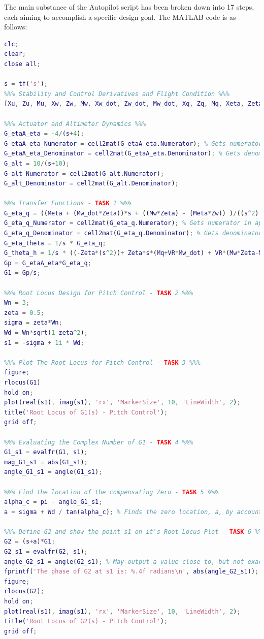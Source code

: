 \documentclass[stu, a4paper, 12pt, floatsintext]{apa7}
\numberwithin{figure}{section}
\numberwithin{table}{section}
\numberwithin{equation}{section}
\begin{document}
The main substance of the Autopilot script has been broken down into 17 steps, each aiming to accomplish a specific design goal. The MATLAB code is as follows:
\begin{lstlisting}[language=MATLAB]
%%% Workspace Cleanup %%%
clc;
clear;
close all;

s = tf('s');
%%% Stability and Control Derivatives and Flight Condition %%%
[Xu, Zu, Mu, Xw, Zw, Mw, Xw_dot, Zw_dot, Mw_dot, Xq, Zq, Mq, Xeta, Zeta, Meta, VR, g] = final_assignment_variables(); % Change the name of this function to to run this system with different variable values.

%%% Actuator and Altimeter Dynamics %%%
G_etaA_eta = -4/(s+4);
G_etaA_eta_Numerator = cell2mat(G_etaA_eta.Numerator); % Gets numerator in appropriate form for Simulink
G_etaA_eta_Denominator = cell2mat(G_etaA_eta.Denominator); % Gets denominator in appropriate form for Simulink
G_alt = 10/(s+10);
G_alt_Numerator = cell2mat(G_alt.Numerator);
G_alt_Denominator = cell2mat(G_alt.Denominator);

%%% Transfer Functions - TASK 1 %%% 
G_eta_q = ((Meta + (Mw_dot*Zeta))*s + ((Mw*Zeta) - (Meta*Zw)) )/((s^2) - ((VR*Mw_dot) + Zw + Mq)*s +((Mq*Zw) - (VR*Mw)));
G_eta_q_Numerator = cell2mat(G_eta_q.Numerator); % Gets numerator in appropriate form for Simulink
G_eta_q_Denominator = cell2mat(G_eta_q.Denominator); % Gets denominator in appropriate form for Simulink
G_eta_theta = 1/s * G_eta_q;
G_theta_h = 1/s * ((-Zeta*(s^2))+ Zeta*s*(Mq+VR*Mw_dot) + VR*(Mw*Zeta-Meta*Zw))/(s*(Meta+Mw_dot*Zeta) + (Mw*Zeta-Meta*Zw));
Gp = G_etaA_eta*G_eta_q;
G1 = Gp/s;

%%% Root Locus Design for Pitch Control - TASK 2 %%%
Wn = 3;
zeta = 0.5;
sigma = zeta*Wn;
Wd = Wn*sqrt(1-zeta^2);
s1 = -sigma + 1i * Wd;

%%% Plot The Root Locus for Pitch Control - TASK 3 %%%
figure;
rlocus(G1)
hold on;
plot(real(s1), imag(s1), 'rx', 'MarkerSize', 10, 'LineWidth', 2);
title('Root Locus of G1(s) - Pitch Control');
grid off;

%%% Evaluating the Complex Number of G1 - TASK 4 %%%
G1_s1 = evalfr(G1, s1);
mag_G1_s1 = abs(G1_s1);
angle_G1_s1 = angle(G1_s1);

%%% Find the location of the compensating Zero - TASK 5 %%%
alpha_c = pi - angle_G1_s1;
a = sigma + Wd / tan(alpha_c); % Finds the zero location, a, by accounting for the phase shortfall at point s1. 

%%% Define G2 and show the point s1 on it's Root Locus Plot - TASK 6 %%%
G2 = (s+a)*G1;
G2_s1 = evalfr(G2, s1);
angle_G2_s1 = angle(G2_s1); % May output a value close to, but not exactly pi - the criterion should still be met.
fprintf('The phase of G2 at s1 is: %.4f radians\n', abs(angle_G2_s1));
figure;
rlocus(G2);
hold on;
plot(real(s1), imag(s1), 'rx', 'MarkerSize', 10, 'LineWidth', 2);
title('Root Locus of G2(s) - Pitch Control');
grid off;


\end{lstlisting}
\end{document}
